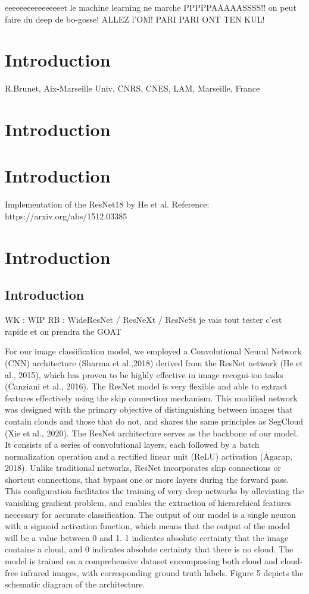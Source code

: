 \documentclass[a4paper,12pt]{article}
\begin{document}
eeeeeeeeeeeeeeeet le machine learning ne marche PPPPPAAAAASSSS!! on peut faire du deep de bo-gosse! ALLEZ l'OM! PARI PARI ONT TEN KUL!


\section{Introduction}
R.Brunet, Aix-Marseille Univ, CNRS, CNES, LAM, Marseille, France

\section{Introduction}
\section{Introduction}

Implementation of the ResNet18 by He et al.
    Reference: https://arxiv.org/abs/1512.03385
\section{Introduction}
\subsection{Introduction}
WK : WIP
RB : WideResNet / ResNeXt / ResNeSt je vais tout tester
c’est rapide et on prendra the GOAT

For our image classification model, we employed a Convolutional Neural Network (CNN) architecture (Sharma et al.,2018) derived from the ResNet network (He et al., 2015), which has proven to be highly effective in image recogni-ion tasks (Canziani et al., 2016).
The ResNet model is very flexible and able to extract features effectively using the skip connection mechanism.
This modified network was designed with the primary objective of distinguishing between images that contain clouds and those that do not, and shares the same principles as SegCloud (Xie et al., 2020).
The ResNet architecture serves as the backbone of our model.
It consists of a series of convolutional layers, each followed by a batch normalization operation and a rectified linear unit (ReLU) activation (Agarap, 2018).
Unlike traditional networks, ResNet incorporates skip connections or shortcut connections, that bypass one or more layers during the forward pass.
This configuration facilitates the training of very deep networks by alleviating the vanishing gradient problem, and enables the extraction of hierarchical features necessary for accurate classification.
The output of our model is a single neuron with a sigmoid activation function, which means that the output of the model will be a value between 0 and 1.
1 indicates absolute certainty that the image contains a cloud, and 0 indicates absolute certainty that there is no cloud.
The model is trained on a comprehensive dataset encompassing both cloud and cloud-free infrared images, with corresponding ground truth labels.
Figure 5 depicts the schematic diagram of the architecture.
\end{document}
